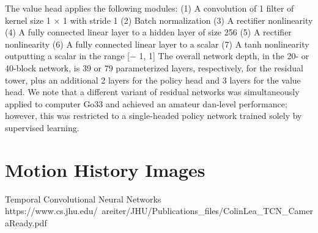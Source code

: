 \documentclass[11.7pt]{article}
\begin{document}
The value head applies the following modules:
(1) A convolution of 1 filter of kernel size 1 × 1 with stride 1
(2) Batch normalization
(3) A rectifier nonlinearity
(4) A fully connected linear layer to a hidden layer of size 256
(5) A rectifier nonlinearity
(6) A fully connected linear layer to a scalar
(7) A tanh nonlinearity outputting a scalar in the range [− 1, 1]
The overall network depth, in the 20- or 40-block network, is 39 or 79 parameterized
layers, respectively, for the residual tower, plus an additional 2 layers for
the policy head and 3 layers for the value head.
We note that a different variant of residual networks was simultaneously applied
to computer Go33 and achieved an amateur dan-level performance; however, this
was restricted to a single-headed policy network trained solely by supervised
learning.

\section{Motion History Images}
Temporal Convolutional Neural Networks https://www.cs.jhu.edu/~areiter/JHU/Publications_files/ColinLea_TCN_CameraReady.pdf
\end{document}
